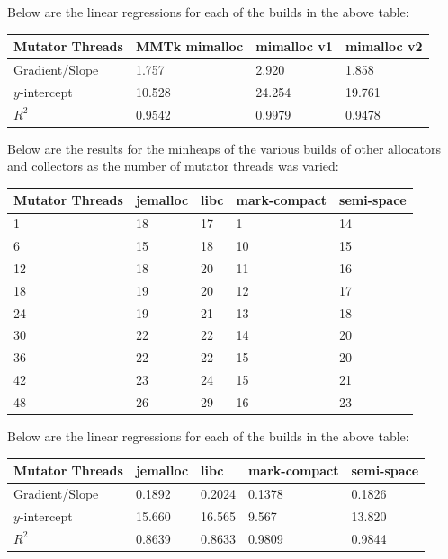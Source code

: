 \documentclass{article}
\begin{document}
Below are the linear regressions for each of the builds in the above table:
\begin{center}
    \begin{tabular}{|l|l|l|l|}
        \hline
        Mutator Threads & MMTk mimalloc & mimalloc v1 & mimalloc v2\\
        \hline
        Gradient/Slope & 1.757 & 2.920 & 1.858\\
        \hline
        $y$-intercept & 10.528 & 24.254 & 19.761\\
        \hline
        $R^2$ & 0.9542 & 0.9979 & 0.9478\\
        \hline
    \end{tabular}
\end{center}

Below are the results for the minheaps of the various builds of other allocators and collectors as the number of mutator threads was varied:
\begin{center}
    \begin{tabular}{|l|l|l|l|l|}
        \hline
        Mutator Threads & jemalloc & libc & mark-compact & semi-space\\
        \hline
        1 & 18 & 17 & 1 & 14\\
        \hline
        6 & 15 & 18 & 10 & 15\\
        \hline
        12 & 18 & 20 & 11 & 16\\
        \hline
        18 & 19 & 20 & 12 & 17\\
        \hline
        24 & 19 & 21 & 13 & 18\\
        \hline
        30 & 22 & 22 & 14 & 20\\
        \hline
        36 & 22 & 22 & 15 & 20\\
        \hline
        42 & 23 & 24 & 15 & 21\\
        \hline
        48 & 26 & 29 & 16 & 23\\
        \hline
    \end{tabular}
\end{center}

Below are the linear regressions for each of the builds in the above table:
\begin{center}
    \begin{tabular}{|l|l|l|l|l|}
        \hline
        Mutator Threads & jemalloc & libc & mark-compact & semi-space\\
        \hline
        Gradient/Slope & 0.1892 & 0.2024 & 0.1378 & 0.1826\\
        \hline
        $y$-intercept & 15.660 & 16.565 & 9.567 & 13.820\\
        \hline
        $R^2$ & 0.8639 & 0.8633 & 0.9809 & 0.9844\\
        \hline
    \end{tabular}
\end{center}
\end{document}
